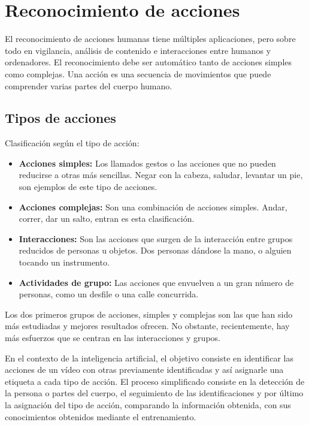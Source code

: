 \section{Reconocimiento de acciones}
 El reconocimiento de acciones humanas tiene múltiples aplicaciones, pero sobre todo en vigilancia, análisis de contenido e interacciones entre humanos y ordenadores. El reconocimiento debe ser automático tanto de acciones simples como complejas. Una acción es una secuencia de movimientos que puede  comprender varias partes del cuerpo humano.
 
 \subsection{Tipos de acciones}
  Clasificación según el tipo de acción:
 \begin{itemize}
 
 \item \textbf {Acciones simples:} Los llamados gestos o las acciones que no pueden reducirse a otras más sencillas. Negar con la cabeza, saludar, levantar un pie, son ejemplos de este tipo de acciones.   
 
 \item \textbf {Acciones complejas:} Son una combinación de acciones simples.  Andar, correr, dar un salto, entran es esta clasificación.
 
 \item \textbf {Interacciones:} Son las acciones que surgen de la interacción entre grupos reducidos de personas u objetos. Dos personas dándose la mano, o alguien tocando un instrumento.
 
 \item \textbf {Actividades de grupo:} Las acciones que envuelven a un gran número de personas, como un desfile o una calle concurrida.

  \end{itemize}
 Los dos primeros grupos de acciones, simples y complejas son las que han sido más estudiadas y mejores resultados ofrecen. No obstante, recientemente, hay más esfuerzos que se centran en las interacciones y grupos.
 
 En el contexto de la inteligencia artificial, el objetivo consiste en identificar las acciones de un vídeo con otras  previamente identificadas y así asignarle una etiqueta a cada tipo de acción.  El proceso simplificado consiste en la detección de la persona o partes del cuerpo, el seguimiento de las identificaciones  y por último la asignación del tipo de acción, comparando la información obtenida, con sus conocimientos obtenidos mediante el entrenamiento.
 
